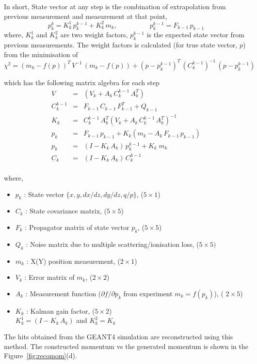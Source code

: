 In short, State vector at any step is the combination of extrapolation from previous
measurement and measurement at that point,
$$  p^k_k = K^1_k \,p^{k-1}_k + K^2_k \,m_k, \hspace{2cm} p_k^{k-1} = F_{k-1}\,p_{k-1}$$
where,  $K^1_k$ and $K^2_k$ are two weight factors, $p^{k-1}_k$ is the expected state
vector from previous measurements. The weight factors is calculated
(for true state vector, $p$) from the minimisation of
$$\chi^2  = (m_k - f(p))^T \,V^{-1}\, (m_k - f(p)) + (p - p_k^{k-1})^T \,(C^{k-1}_k)^{-1} \,(p - p_k^{k-1})$$

which has the following matrix algebra for each step
\begin{eqnarray*}
  V &=& (V_k + A_k \,C_k^{k-1} \,A_k^T) \\
  C^{k-1}_k &=& F_{k-1}\, C_{k-1}\, F^T_{k-1} + Q_{k-1} \\
  K_k &=& C^{k-1}_k\, A_k^T (V_k + A_k\, C^{k-1}_k\, A_k^T)^{-1} \\
  p_k &=& F_{k-1}\, p_{k-1} + K_k (m_k - A_k \,F_{k-1}\,p_{k-1}) \\
  p_k &=& (I-K_k\,A_k)\, p_k^{k-1} + K_k\;m_k \\
  C_k &=& (I - K_k\, A_k)\, C_k^{k-1} \\
\end{eqnarray*}

where,
\begin{itemize}
\item $p_k$ : State vector $ \{x, y, dx/dz, dy/dz, q/p\}$, ($5 \times 1$)
\item $C_k$ : State covariance matrix, ($5 \times 5$)
\item $F_k$ : Propagator matrix of state vector $p_k$, ($5 \times 5$)
\item $Q_k$ : Noise matrix due to multiple scattering/ionisation loss, ($5 \times5) $
\item $m_k$ : X(Y) position measurement, ($2 \times 1$)
\item $V_k$ : Error matrix of $m_k$, ($2 \times 2$)
\item $A_k$ : Measurement function ($\partial f /\partial p_k$ from experiment $m_k=f(p_k)$), ( $2 \times 5$)
\item $K_k$ :  Kalman gain factor, ($5 \times 2$)  \\
  $K^1_k = (I - K_k\,A_k)$ and $K^2_k = K_k$
\end{itemize}  

The hits obtained from the GEANT4 simulation are reconstructed using
this method. The constructed momentum vs the generated momentum is
shown in the Figure~\ref{fig:recomom}(d).



